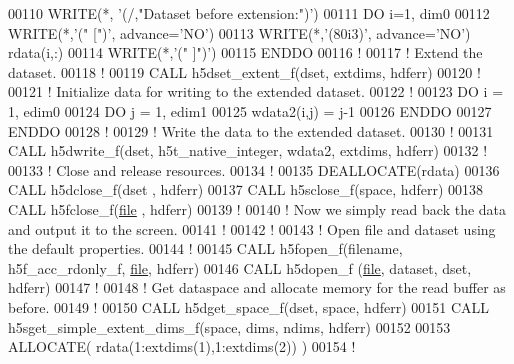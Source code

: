 \begin{DoxyCode}
00110   \textcolor{keyword}{WRITE}(*, \textcolor{stringliteral}{'(/,"Dataset before extension:")'})
00111   \textcolor{keywordflow}{DO} i=1, dim0
00112      \textcolor{keyword}{WRITE}(*,\textcolor{stringliteral}{'(" [")'}, advance=\textcolor{stringliteral}{'NO'})
00113      \textcolor{keyword}{WRITE}(*,\textcolor{stringliteral}{'(80i3)'}, advance=\textcolor{stringliteral}{'NO'}) rdata(i,:)
00114      \textcolor{keyword}{WRITE}(*,\textcolor{stringliteral}{'(" ]")'})
00115 \textcolor{keywordflow}{  ENDDO}
00116   \textcolor{comment}{!}
00117   \textcolor{comment}{! Extend the dataset.}
00118   \textcolor{comment}{!}
00119   \textcolor{keyword}{CALL }h5dset\_extent\_f(dset, extdims, hdferr)
00120   \textcolor{comment}{!}
00121   \textcolor{comment}{! Initialize data for writing to the extended dataset.}
00122   \textcolor{comment}{!}
00123   \textcolor{keywordflow}{DO} i = 1, edim0
00124      \textcolor{keywordflow}{DO} j = 1, edim1
00125         wdata2(i,j) = j-1
00126 \textcolor{keywordflow}{     ENDDO}
00127 \textcolor{keywordflow}{  ENDDO}
00128   \textcolor{comment}{!}
00129   \textcolor{comment}{! Write the data to the extended dataset.}
00130   \textcolor{comment}{!}
00131   \textcolor{keyword}{CALL }h5dwrite\_f(dset, h5t\_native\_integer, wdata2, extdims, hdferr)
00132   \textcolor{comment}{!}
00133   \textcolor{comment}{! Close and release resources.}
00134   \textcolor{comment}{!}
00135   \textcolor{keyword}{DEALLOCATE}(rdata)
00136   \textcolor{keyword}{CALL }h5dclose\_f(dset , hdferr)
00137   \textcolor{keyword}{CALL }h5sclose\_f(space, hdferr)
00138   \textcolor{keyword}{CALL }h5fclose\_f(\hyperlink{structfile}{file} , hdferr)
00139   \textcolor{comment}{!}
00140   \textcolor{comment}{! Now we simply read back the data and output it to the screen.}
00141   \textcolor{comment}{!}
00142   \textcolor{comment}{!}
00143   \textcolor{comment}{! Open file and dataset using the default properties.}
00144   \textcolor{comment}{!}
00145   \textcolor{keyword}{CALL }h5fopen\_f(filename, h5f\_acc\_rdonly\_f, \hyperlink{structfile}{file}, hdferr)
00146   \textcolor{keyword}{CALL }h5dopen\_f (\hyperlink{structfile}{file}, dataset, dset, hdferr)
00147   \textcolor{comment}{!}
00148   \textcolor{comment}{! Get dataspace and allocate memory for the read buffer as before.}
00149   \textcolor{comment}{!}
00150   \textcolor{keyword}{CALL }h5dget\_space\_f(dset, space, hdferr)
00151   \textcolor{keyword}{CALL }h5sget\_simple\_extent\_dims\_f(space, dims, ndims, hdferr)
00152   
00153   \textcolor{keyword}{ALLOCATE}( rdata(1:extdims(1),1:extdims(2)) )
00154   \textcolor{comment}{!}

\end{DoxyCode}
